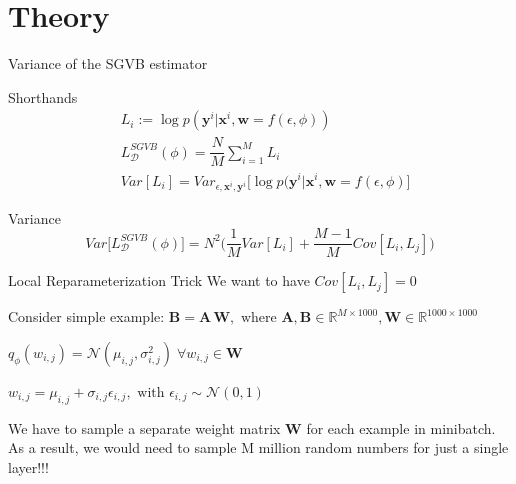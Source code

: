 \documentclass{beamer}
\newcommand{\bx}{\mathbf{x}}
\newcommand{\by}{\mathbf{y}}
\newcommand{\bw}{\mathbf{w}}
\newcommand{\bW}{\mathbf{W}}
\newcommand{\bA}{\mathbf{A}}
\newcommand{\bB}{\mathbf{B}}
\begin{document}
\section{Theory}
\begin{frame}{Variance of the SGVB estimator}
    \begin{block}{Shorthands}
    	\begin{align*}
    		&L_i := \log p(\by^i | \bx^i, \bw = f(\epsilon, \phi)) \\
    		&L_\mathcal{D}^{SGVB}(\phi) = \dfrac{N}{M} \sum\limits_{i=1}^M L_i \\
    		&Var[L_i] = Var_{\epsilon, \bx^i, \by^i} \bigl[ \log p(\by^i | \bx^i, \bw = f(\epsilon, \phi) \bigr]
    	\end{align*}
    \end{block}

    \begin{block}{Variance}
    	\begin{equation*}
    		Var \bigl[ L_\mathcal{D}^{SGVB}(\phi) \bigr] = N^2 \biggl( \dfrac{1}{M} Var[L_i] + \dfrac{M-1}{M} Cov[L_i, L_j] \biggr)
    	\end{equation*}
    \end{block}
    
\end{frame}


\begin{frame}{Local Reparameterization Trick}
	We want to have $Cov[L_i, L_j] = 0$
	
	Consider simple example: $\bB = \bA \, \bW, \text{ where } \bA, \bB \in \mathbb{R}^{M \times 1000}, \bW \in \mathbb{R}^{1000 \times 1000}$
	
	$q_\phi(w_{i, j}) = \mathcal{N}(\mu_{i, j}, \sigma_{i, j}^2) \; \forall w_{i, j} \in \bW$
	
	$w_{i, j} = \mu_{i, j} + \sigma_{i, j} \epsilon_{i, j}, \text{ with } \epsilon_{i, j} \sim \mathcal{N}(0, 1)$
	
	We have to sample a separate weight matrix $\bW$ for each example in minibatch.
	As a result, we would need to sample M million random numbers for just a single layer!!!
	
\end{frame}
\end{document}
